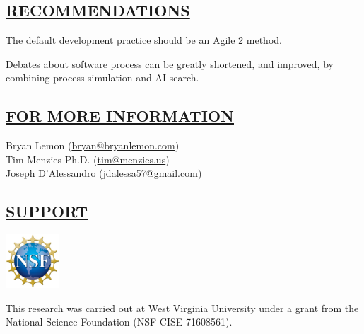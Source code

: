 \begin{kasten}
  \section*{ \hspace{0.1cm} {\color{red} \underline{RECOMMENDATIONS}}}
    \vspace{-0.5em}
  \large
  \begin{smallenum}
    \item The default development practice should be an Agile 2 method.
    \item Debates about software process can be greatly shortened, and
      improved, by combining process simulation and  AI search.
  \end{smallenum}
    \vspace{-0.5em}
\end{kasten}

\begin{kasten}
    \section*{ \hspace{0.1cm} {\color{red} \underline{FOR MORE INFORMATION}}}
    \vspace{-0.5em}
    \normalsize{
      Bryan Lemon (\url{bryan@bryanlemon.com})\\
      Tim Menzies Ph.D. (\url{tim@menzies.us})\\
      Joseph D'Alessandro (\url{jdalessa57@gmail.com})
    }
    \vspace{-0.5em}
\end{kasten}

\begin{kasten}
    \section*{ \hspace{0.1cm} {\color{red} \underline{SUPPORT}}}
    \vspace{-0.5em}
    \large{
      \begin{minipage}{2cm}
        \includegraphics[width=2cm]{nsf_logo.eps}
      \end{minipage}
      \begin{minipage}{11cm}
This research was carried out at West Virginia
University under a grant from the National Science Foundation (NSF CISE 71608561).
      \end{minipage}
    }
\end{kasten}
